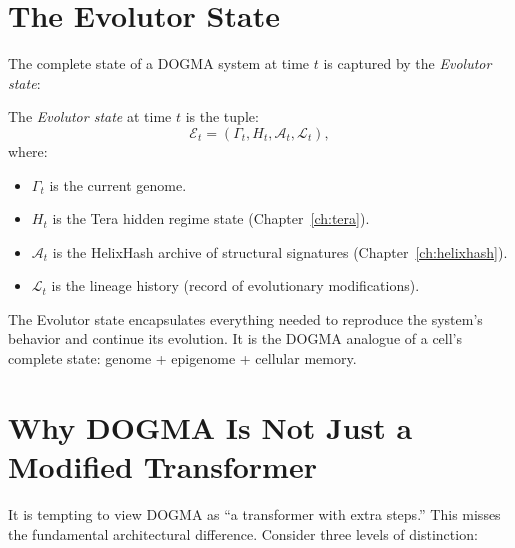 \section{The Evolutor State}
\label{sec:evolutor-state}

The complete state of a DOGMA system at time $t$ is captured by the \emph{Evolutor state}:

\begin{definition}
\label{def:evolutor-state}
The \emph{Evolutor state} at time $t$ is the tuple:
\begin{equation}
\mathcal{E}_t = (\Gamma_t, H_t, \mathcal{A}_t, \mathcal{L}_t),
\end{equation}
where:
\begin{itemize}[leftmargin=1.5em]
  \item $\Gamma_t$ is the current genome.
  \item $H_t$ is the Tera hidden regime state (Chapter~\ref{ch:tera}).
  \item $\mathcal{A}_t$ is the HelixHash archive of structural signatures (Chapter~\ref{ch:helixhash}).
  \item $\mathcal{L}_t$ is the lineage history (record of evolutionary modifications).
\end{itemize}
\end{definition}

The Evolutor state encapsulates everything needed to reproduce the system's behavior and continue its evolution. It is the DOGMA analogue of a cell's complete state: genome + epigenome + cellular memory.

\section{Why DOGMA Is Not Just a Modified Transformer}
\label{sec:not-transformer}

It is tempting to view DOGMA as ``a transformer with extra steps.'' This misses the fundamental architectural difference. Consider three levels of distinction:

